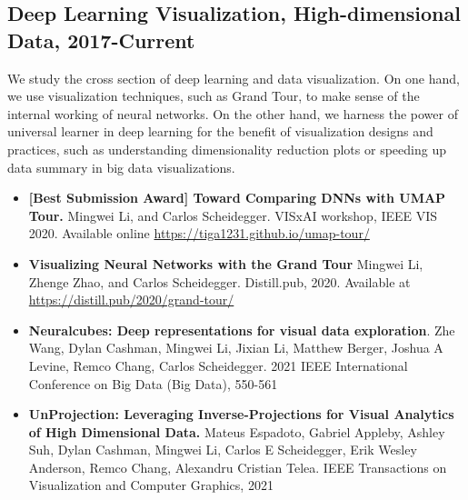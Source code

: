 \documentclass[letterpaper,11pt,oneside]{article}
\begin{document}
\subsection*{Deep Learning Visualization, High-dimensional Data, 2017-Current}
We study the cross section of deep learning and data visualization. 
    On one hand, we use visualization techniques, such as Grand Tour, to make sense of the internal working of neural networks. 
    On the other hand, we harness the power of universal learner in deep learning for the benefit of visualization designs and practices, such as understanding dimensionality reduction plots or speeding up data summary in big data visualizations.
    \begin{itemize}
        \item \textbf{[Best Submission Award] Toward Comparing DNNs with UMAP Tour. }
            Mingwei Li, and Carlos Scheidegger. 
            VISxAI workshop, IEEE VIS 2020. Available online \url{https://tiga1231.github.io/umap-tour/}
        \item \textbf{Visualizing Neural Networks with the Grand Tour}
            Mingwei Li, Zhenge Zhao, and Carlos Scheidegger.
            Distill.pub, 2020. Available at \url{https://distill.pub/2020/grand-tour/}
        \item \textbf{Neuralcubes: Deep representations for visual data exploration}. 
            Zhe Wang, Dylan Cashman, Mingwei Li, Jixian Li, Matthew Berger, Joshua A Levine, Remco Chang, Carlos Scheidegger. 
            2021 IEEE International Conference on Big Data (Big Data), 550-561
        \item \textbf{UnProjection: Leveraging Inverse-Projections for Visual Analytics of High Dimensional Data.}
            Mateus Espadoto, Gabriel Appleby, Ashley Suh, Dylan Cashman, Mingwei Li, Carlos E Scheidegger, Erik Wesley Anderson, Remco Chang, Alexandru Cristian Telea. 
            IEEE Transactions on Visualization and Computer Graphics, 2021
    \end{itemize}
\end{document}
